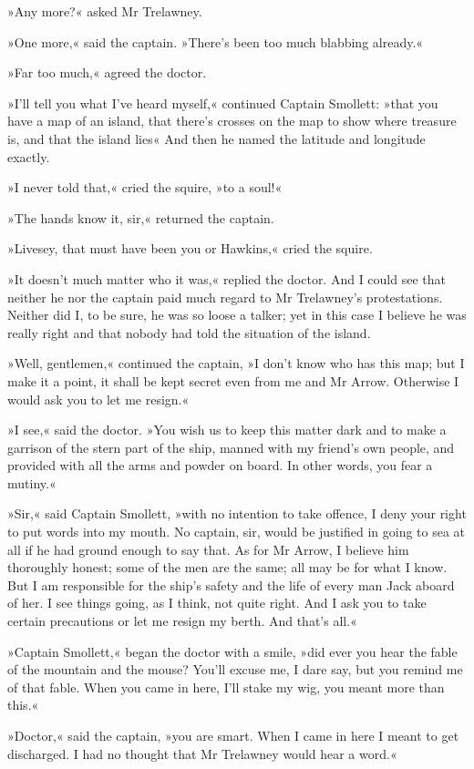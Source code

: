 »Any more?« asked Mr Trelawney.

»One more,« said the captain. »There's been too much blabbing already.«

»Far too much,« agreed the doctor.

»I'll tell you what I've heard myself,« continued Captain Smollett: »that you have a map of an island, that there's crosses on the map to show where treasure is, and that the island lies\longdash« And then he named the latitude and longitude exactly.

»I never told that,« cried the squire, »to a soul!«

»The hands know it, sir,« returned the captain.

»Livesey, that must have been you or Hawkins,« cried the squire.

»It doesn't much matter who it was,« replied the doctor. And I could see that neither he nor the captain paid much regard to Mr Trelawney's protestations. Neither did I, to be sure, he was so loose a talker; yet in this case I believe he was really right and that nobody had told the situation of the island.

»Well, gentlemen,« continued the captain, »I don't know who has this map; but I make it a point, it shall be kept secret even from me and Mr Arrow. Otherwise I would ask you to let me resign.«

»I see,« said the doctor. »You wish us to keep this matter dark and to make a garrison of the stern part of the ship, manned with my friend's own people, and provided with all the arms and powder on board. In other words, you fear a mutiny.«

»Sir,« said Captain Smollett, »with no intention to take offence, I deny your right to put words into my mouth. No captain, sir, would be justified in going to sea at all if he had ground enough to say that. As for Mr Arrow, I believe him thoroughly honest; some of the men are the same; all may be for what I know. But I am responsible for the ship's safety and the life of every man Jack aboard of her. I see things going, as I think, not quite right. And I ask you to take certain precautions or let me resign my berth. And that's all.«

»Captain Smollett,« began the doctor with a smile, »did ever you hear the fable of the mountain and the mouse? You'll excuse me, I dare say, but you remind me of that fable. When you came in here, I'll stake my wig, you meant more than this.«

»Doctor,« said the captain, »you are smart. When I came in here I meant to get discharged. I had no thought that Mr Trelawney would hear a word.«

